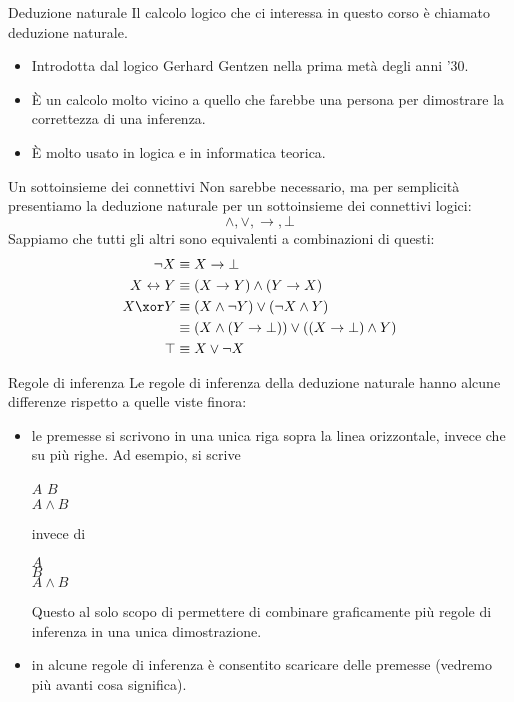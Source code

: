 \documentclass[aspectratio=169,10pt,dvipsnames,xcolor=table,handout]{beamer}
\begin{document}
\begin{frame}{Deduzione naturale}
    Il calcolo logico che ci interessa in questo corso è chiamato \alert{deduzione naturale}.
    \begin{itemize}
        \item Introdotta dal logico Gerhard Gentzen nella prima metà degli anni '30.
        \item È un calcolo molto vicino a quello che farebbe una persona per dimostrare la correttezza di una inferenza.
        \item È molto usato in logica e in informatica teorica.
    \end{itemize}
\end{frame}

\begin{frame}{Un sottoinsieme dei connettivi}
    Non sarebbe necessario, ma per semplicità presentiamo la deduzione naturale per un sottoinsieme dei connettivi logici:
    \[
    \land, \lor, \to, \bot
    \]
    Sappiamo che tutti gli altri sono equivalenti a combinazioni di questi:
    \begin{align*}
        \neg X &\equiv X \to \bot\\
        X \leftrightarrow Y &\equiv (X \to Y) \land (Y \to X)\\
        X \xor Y &\equiv (X \land \neg Y) \lor (\neg X \land Y)\\
        & \equiv (X \land (Y \to \bot)) \lor ((X \to \bot) \land Y)\\
        \top & \equiv X \lor \neg X
    \end{align*}
\end{frame}

\begin{frame}{Regole di inferenza}
    Le regole di inferenza della deduzione naturale hanno alcune differenze rispetto a quelle viste finora:
    \begin{itemize}
    \item le premesse si scrivono in una unica riga sopra la linea orizzontale, invece che su più righe. Ad esempio, si scrive
    \begin{center}
        \begin{inference}
            $A$ \qquad $B$\\
            \hline
            $A \land B$
        \end{inference}
        \qquad invece di \qquad
        \begin{inference}
            $A$ \\
            $B$\\
            \hline
            $A \land B$
        \end{inference}
    \end{center}

    Questo al solo scopo di permettere di combinare graficamente più regole di inferenza in una unica \alert{dimostrazione}.
    \item in alcune regole di inferenza è consentito \alert{scaricare} delle premesse (vedremo più avanti cosa significa).
    \end{itemize}
\end{frame}
\end{document}

